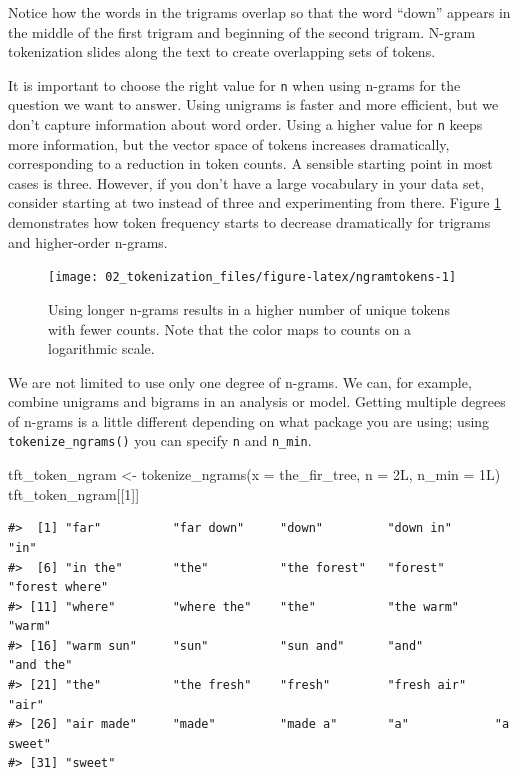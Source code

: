 \documentclass[
]{krantz}
\makeatletter
\newenvironment{Shaded}{\begin{snugshade}}{\end{snugshade}}
\newcommand{\AttributeTok}[1]{\textcolor[rgb]{0.77,0.63,0.00}{#1}}
\newcommand{\DecValTok}[1]{\textcolor[rgb]{0.00,0.00,0.81}{#1}}
\newcommand{\FunctionTok}[1]{\textcolor[rgb]{0.00,0.00,0.00}{#1}}
\newcommand{\NormalTok}[1]{#1}
\newcommand{\OtherTok}[1]{\textcolor[rgb]{0.56,0.35,0.01}{#1}}
\newenvironment{kframe}{%
\medskip{}
\setlength{\fboxsep}{.8em}
 \def\at@end@of@kframe{}%
 \ifinner\ifhmode%
  \def\at@end@of@kframe{\end{minipage}}%
  \begin{minipage}{\columnwidth}%
 \fi\fi%
 \def\FrameCommand##1{\hskip\@totalleftmargin \hskip-\fboxsep
 \colorbox{shadecolor}{##1}\hskip-\fboxsep
     \hskip-\linewidth \hskip-\@totalleftmargin \hskip\columnwidth}%
 \MakeFramed {\advance\hsize-\width
   \@totalleftmargin\z@ \linewidth\hsize
   \@setminipage}}%
 {\par\unskip\endMakeFramed%
 \at@end@of@kframe}
\renewenvironment{Shaded}{\begin{kframe}}{\end{kframe}}
\makeatother
\begin{document}
Notice how the words in the trigrams overlap so that the word ``down'' appears in the middle of the first trigram and beginning of the second trigram. N-gram tokenization slides along the text to create overlapping sets of tokens.

It is important to choose the right value for \texttt{n} when using n-grams for the question we want to answer. Using unigrams is faster and more efficient, but we don't capture information about word order. Using a higher value for \texttt{n} keeps more information, but the vector space of tokens increases dramatically, corresponding to a reduction in token counts. A sensible starting point in most cases is three. However, if you don't have a large vocabulary in your data set, consider starting at two instead of three and experimenting from there. Figure \ref{fig:ngramtokens} demonstrates how token frequency starts to decrease dramatically for trigrams and higher-order n-grams.

\begin{figure}

{\centering \texttt{[image: 02\_tokenization\_files/figure-latex/ngramtokens-1]} 

}

\caption{Using longer n-grams results in a higher number of unique tokens with fewer counts. Note that the color maps to counts on a logarithmic scale.}\label{fig:ngramtokens}
\end{figure}

We are not limited to use only one degree of n-grams. We can, for example, combine unigrams and bigrams in an analysis or model. Getting multiple degrees of n-grams is a little different depending on what package you are using; using \texttt{tokenize\_ngrams()} you can specify \texttt{n} and \texttt{n\_min}.

\begin{Shaded}
\begin{Highlighting}[]
\NormalTok{tft\_token\_ngram }\OtherTok{\textless{}{-}} \FunctionTok{tokenize\_ngrams}\NormalTok{(}\AttributeTok{x =}\NormalTok{ the\_fir\_tree,}
                                   \AttributeTok{n =}\NormalTok{ 2L,}
                                   \AttributeTok{n\_min =}\NormalTok{ 1L)}
\NormalTok{tft\_token\_ngram[[}\DecValTok{1}\NormalTok{]]}
\end{Highlighting}
\end{Shaded}

\begin{verbatim}
#>  [1] "far"          "far down"     "down"         "down in"      "in"          
#>  [6] "in the"       "the"          "the forest"   "forest"       "forest where"
#> [11] "where"        "where the"    "the"          "the warm"     "warm"        
#> [16] "warm sun"     "sun"          "sun and"      "and"          "and the"     
#> [21] "the"          "the fresh"    "fresh"        "fresh air"    "air"         
#> [26] "air made"     "made"         "made a"       "a"            "a sweet"     
#> [31] "sweet"
\end{verbatim}
\end{document}
